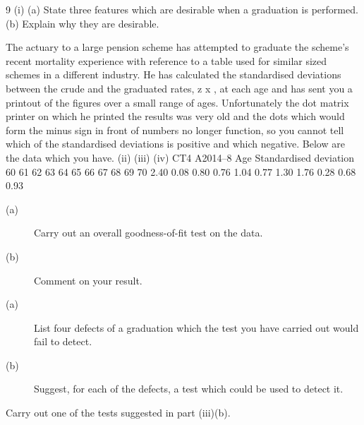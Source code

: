 \documentclass[a4paper,12pt]{article}
\begin{document}
\begin{enumerate}
9
(i)
(a) State three features which are desirable when a graduation is
performed.
(b) Explain why they are desirable.

The actuary to a large pension scheme has attempted to graduate the scheme’s recent
mortality experience with reference to a table used for similar sized schemes in a
different industry. He has calculated the standardised deviations between the crude
and the graduated rates, z x , at each age and has sent you a printout of the figures over
a small range of ages. Unfortunately the dot matrix printer on which he printed the
results was very old and the dots which would form the minus sign in front of
numbers no longer function, so you cannot tell which of the standardised deviations is
positive and which negative. Below are the data which you have.
(ii)
(iii)
(iv)
CT4 A2014–8
Age Standardised
deviation
60
61
62
63
64
65
66
67
68
69
70 2.40
0.08
0.80
0.76
1.04
0.77
1.30
1.76
0.28
0.68
0.93
\begin{description}
\item[(a)] Carry out an overall goodness-of-fit test on the data.
\item[(b)] Comment on your result.
\item[(a)] List four defects of a graduation which the test you have carried out
would fail to detect.
\item[(b)] Suggest, for each of the defects, a test which could be used to detect it.
\end{description}
Carry out one of the tests suggested in part (iii)(b).



\end{enumerate}
\end{document}
